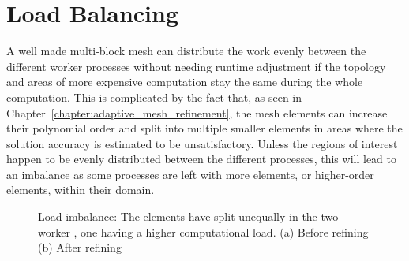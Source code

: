 \chapter{Load Balancing}\label{chapter:load_balancing}

A well made multi-block mesh can distribute the work evenly between the different worker processes
without needing runtime adjustment if the topology and areas of more expensive computation stay the
same during the whole computation. This is complicated by the fact that, as seen in
Chapter~\ref{chapter:adaptive_mesh_refinement}, the mesh elements can increase their polynomial
order and split into multiple smaller elements in areas where the solution accuracy is estimated to
be unsatisfactory. Unless the regions of interest happen to be evenly distributed between the
different processes, this will lead to an imbalance as some processes are left with more elements,
or higher-order elements, within their domain.

\begin{figure}[H]
	\centering
	\hfill
	\caption{Load imbalance: The elements have split unequally in the two worker , one having a higher computational load. (a) Before refining (b) After refining}\label{fig:load_imbalance_lb}
\end{figure}

